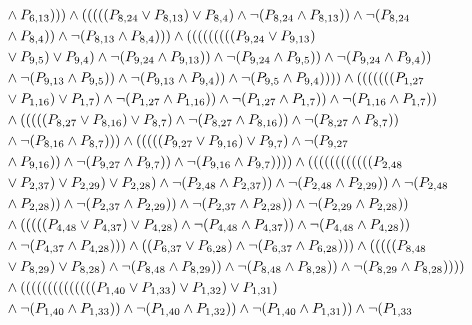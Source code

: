 \documentclass[10pt]{article}
\begin{document}
\begin{align*}
& \land \PV{6,13}))) \land (((((\PV{8,24} \lor \PV{8,13}) \lor \PV{8,4}) \land \lnot(\PV{8,24} \land \PV{8,13})) \land \lnot(\PV{8,24} \\
& \land \PV{8,4})) \land \lnot(\PV{8,13} \land \PV{8,4}))) \land (((((((((\PV{9,24} \lor \PV{9,13}) \\
& \lor \PV{9,5}) \lor \PV{9,4}) \land \lnot(\PV{9,24} \land \PV{9,13})) \land \lnot(\PV{9,24} \land \PV{9,5})) \land \lnot(\PV{9,24} \land \PV{9,4})) \\
& \land \lnot(\PV{9,13} \land \PV{9,5})) \land \lnot(\PV{9,13} \land \PV{9,4})) \land \lnot(\PV{9,5} \land \PV{9,4})))) \land (((((((\PV{1,27} \\
& \lor \PV{1,16}) \lor \PV{1,7}) \land \lnot(\PV{1,27} \land \PV{1,16})) \land \lnot(\PV{1,27} \land \PV{1,7})) \land \lnot(\PV{1,16} \land \PV{1,7})) \\
& \land (((((\PV{8,27} \lor \PV{8,16}) \lor \PV{8,7}) \land \lnot(\PV{8,27} \land \PV{8,16})) \land \lnot(\PV{8,27} \land \PV{8,7})) \\
& \land \lnot(\PV{8,16} \land \PV{8,7}))) \land (((((\PV{9,27} \lor \PV{9,16}) \lor \PV{9,7}) \land \lnot(\PV{9,27} \\
& \land \PV{9,16})) \land \lnot(\PV{9,27} \land \PV{9,7})) \land \lnot(\PV{9,16} \land \PV{9,7})))) \land ((((((((((((\PV{2,48} \\
& \lor \PV{2,37}) \lor \PV{2,29}) \lor \PV{2,28}) \land \lnot(\PV{2,48} \land \PV{2,37})) \land \lnot(\PV{2,48} \land \PV{2,29})) \land \lnot(\PV{2,48} \\
& \land \PV{2,28})) \land \lnot(\PV{2,37} \land \PV{2,29})) \land \lnot(\PV{2,37} \land \PV{2,28})) \land \lnot(\PV{2,29} \land \PV{2,28})) \\
& \land (((((\PV{4,48} \lor \PV{4,37}) \lor \PV{4,28}) \land \lnot(\PV{4,48} \land \PV{4,37})) \land \lnot(\PV{4,48} \land \PV{4,28})) \\
& \land \lnot(\PV{4,37} \land \PV{4,28}))) \land ((\PV{6,37} \lor \PV{6,28}) \land \lnot(\PV{6,37} \land \PV{6,28}))) \land (((((\PV{8,48} \\
& \lor \PV{8,29}) \lor \PV{8,28}) \land \lnot(\PV{8,48} \land \PV{8,29})) \land \lnot(\PV{8,48} \land \PV{8,28})) \land \lnot(\PV{8,29} \land \PV{8,28})))) \\
& \land ((((((((((((((\PV{1,40} \lor \PV{1,33}) \lor \PV{1,32}) \lor \PV{1,31}) \\
& \land \lnot(\PV{1,40} \land \PV{1,33})) \land \lnot(\PV{1,40} \land \PV{1,32})) \land \lnot(\PV{1,40} \land \PV{1,31})) \land \lnot(\PV{1,33} \\

\end{align*}
\end{document}
